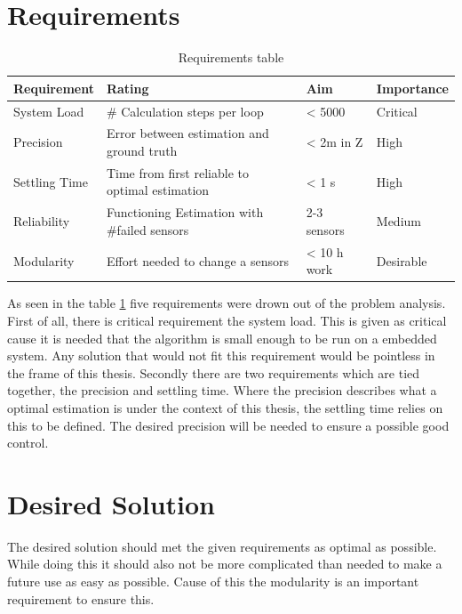  \section{Requirements}
 
 \begin{table}[h]
 \centering
 \begin{tabular}{|l|l|l|l|}	
 \hline	
 \bf{Requirement}   & \bf{Rating} & \bf{Aim} & \bf{Importance} \\ \hline
 System Load   & \# Calculation steps per loop & < 5000 & Critical \\ \hline
 Precision     & Error between estimation and ground truth  & < 2m in Z & High  \\ \hline
 Settling Time & Time from first reliable to optimal estimation  & < 1 s &  High \\ \hline
 Reliability   & Functioning Estimation with \#failed sensors & 2-3 sensors & Medium \\ \hline	
 Modularity    & Effort needed to change a sensors & < 10 h work &  Desirable \\ \hline
 \end{tabular}	
 \caption{Requirements table}
 \label{tab:Requirements}
 \end{table}
 
 As seen in the table \ref{tab:Requirements} five requirements were drown out of the problem analysis. 
 First of all, there is critical requirement the system load. This is given as critical cause it is needed that the algorithm is small enough to be run on a embedded system.
 Any solution that would not fit this requirement would be pointless in the frame of this thesis.
 Secondly there are two requirements which are tied together, the precision and settling time.
 Where the precision describes what a optimal estimation is under the context of this thesis, the settling time relies on this to be defined.
 The desired precision will be needed to ensure a possible good control.
 
 \section{Desired Solution}
 The desired solution should met the given requirements as optimal as possible. While doing this it should also not be more complicated than needed
 to make a future use as easy as possible. Cause of this the modularity is an important requirement to ensure this.
